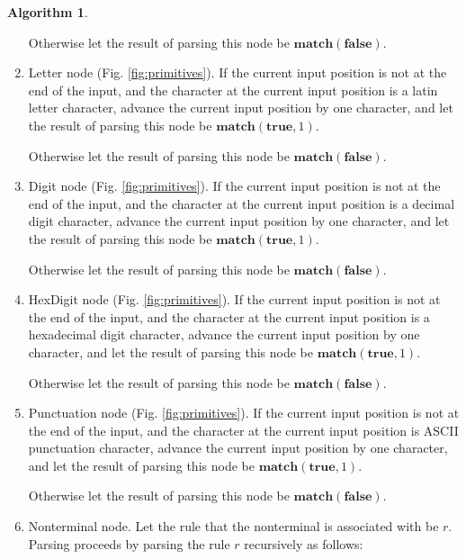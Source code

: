 \documentclass[a4paper,oneside,11pt]{book}
\theoremstyle{definition}
\newtheorem{algo}{Algorithm}[section]
\begin{document}
\begin{algo}
\begin{flushleft}
\begin{enumerate}
Otherwise let the result of parsing this node be $\textbf{match}(\textbf{false})$.

\item
Letter node (Fig. \ref{fig:primitives}). If the current input position is not at the end of the input,
and the character at the current input position is a latin letter character,
advance the current input position by one character,
and let the result of parsing this node be $\textbf{match}(\textbf{true}, 1)$.

Otherwise let the result of parsing this node be $\textbf{match}(\textbf{false})$.

\item
Digit node (Fig. \ref{fig:primitives}). If the current input position is not at the end of the input,
and the character at the current input position is a decimal digit character,
advance the current input position by one character,
and let the result of parsing this node be $\textbf{match}(\textbf{true}, 1)$.

Otherwise let the result of parsing this node be $\textbf{match}(\textbf{false})$.

\item
HexDigit node (Fig. \ref{fig:primitives}). If the current input position is not at the end of the input,
and the character at the current input position is a hexadecimal digit character,
advance the current input position by one character,
and let the result of parsing this node be $\textbf{match}(\textbf{true}, 1)$.

Otherwise let the result of parsing this node be $\textbf{match}(\textbf{false})$.

\item
Punctuation node (Fig. \ref{fig:primitives}). If the current input position is not at the end of the input,
and the character at the current input position is ASCII punctuation character,
advance the current input position by one character,
and let the result of parsing this node be $\textbf{match}(\textbf{true}, 1)$.

Otherwise let the result of parsing this node be $\textbf{match}(\textbf{false})$.

\item
Nonterminal node.
Let the rule that the nonterminal is associated with be $r$.
Parsing proceeds by parsing the rule $r$ recursively as follows:


\end{enumerate}
\end{flushleft}
\end{algo}
\end{document}
